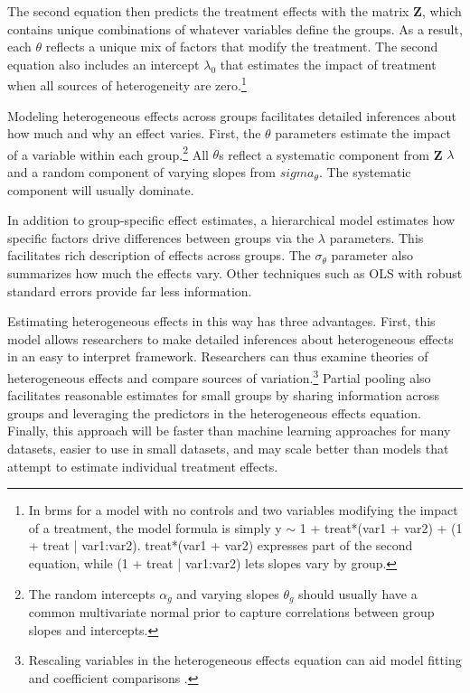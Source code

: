 \documentclass[12pt]{article}
\begin{document}
The second equation then predicts the treatment effects with the matrix \textbf{Z}, which contains unique combinations of whatever variables define the groups.  
As a result, each $\theta$ reflects a unique mix of factors that modify the treatment.
The second equation also includes an intercept $\lambda_0$ that estimates the impact of treatment when all sources of heterogeneity are zero.\footnote{In brms for a model with no controls and two variables modifying the impact of a treatment, the model formula is simply y $\sim$ 1 + treat*(var1 + var2) + (1 + treat | var1:var2). treat*(var1 + var2) expresses part of the second equation, while (1 + treat | var1:var2) lets slopes vary by group.}


Modeling heterogeneous effects across groups facilitates detailed inferences about how much and why an effect varies.
First, the $\theta$ parameters estimate the impact of a variable within each group.\footnote{The random intercepts $\alpha_g$ and varying slopes $\theta_g$ should usually have a common multivariate normal prior to capture correlations between group slopes and intercepts.}
All $\theta$s reflect a systematic component from \textbf{Z} $\lambda$ and a random component of varying slopes from $sigma_\theta$. 
The systematic component will usually dominate. 


In addition to group-specific effect estimates, a hierarchical model estimates how specific factors drive differences between groups via the $\lambda$ parameters.
This facilitates rich description of effects across groups. 
The $\sigma_\theta$ parameter also summarizes how much the effects vary. 
Other techniques such as OLS with robust standard errors provide far less information.


Estimating heterogeneous effects in this way has three advantages.
First, this model allows researchers to make detailed inferences about heterogeneous effects in an easy to interpret framework. 
Researchers can thus examine theories of heterogeneous effects and compare sources of variation.\footnote{Rescaling variables in the heterogeneous effects equation can aid model fitting and coefficient comparisons \citep{Gelman2008}.} 
Partial pooling also facilitates reasonable estimates for small groups by sharing information across groups and leveraging the predictors in the heterogeneous effects equation. 
Finally, this approach will be faster than machine learning approaches for many datasets, easier to use in small datasets, and may scale better than models that attempt to estimate individual treatment effects.
\end{document}
